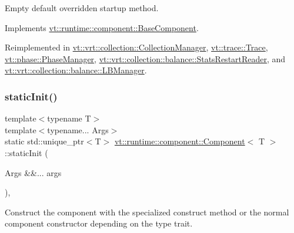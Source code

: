 Empty default overridden startup method. 



Implements \hyperlink{structvt_1_1runtime_1_1component_1_1_base_component_a8bf92f9f0a7027abf7deaefa2e7f5202}{vt\+::runtime\+::component\+::\+Base\+Component}.



Reimplemented in \hyperlink{structvt_1_1vrt_1_1collection_1_1_collection_manager_ac71095016a20dd9607f2f937bf35305e}{vt\+::vrt\+::collection\+::\+Collection\+Manager}, \hyperlink{structvt_1_1trace_1_1_trace_a5dd8767d9020ebeaba49ea3a684738a1}{vt\+::trace\+::\+Trace}, \hyperlink{structvt_1_1phase_1_1_phase_manager_a541d1f6c7a350fad979911ac60f38025}{vt\+::phase\+::\+Phase\+Manager}, \hyperlink{structvt_1_1vrt_1_1collection_1_1balance_1_1_stats_restart_reader_a0a2bd4e4f989766216237d6aedfaaa51}{vt\+::vrt\+::collection\+::balance\+::\+Stats\+Restart\+Reader}, and \hyperlink{structvt_1_1vrt_1_1collection_1_1balance_1_1_l_b_manager_add5427abf4c6e21e39f581635997ddac}{vt\+::vrt\+::collection\+::balance\+::\+L\+B\+Manager}.

\mbox{\label{structvt_1_1runtime_1_1component_1_1_component_ac969a635e579cf7be3af696f500bf260}} 
\subsubsection{\texorpdfstring{static\+Init()}{staticInit()}}
{\footnotesize\ttfamily template$<$typename T$>$ \\
template$<$typename... Args$>$ \\
static std\+::unique\+\_\+ptr$<$T$>$ \hyperlink{structvt_1_1runtime_1_1component_1_1_component}{vt\+::runtime\+::component\+::\+Component}$<$ T $>$\+::static\+Init (\begin{DoxyParamCaption}\item[{Args \&\&...}]{args }\end{DoxyParamCaption})\hspace{0.3cm}{\ttfamily [inline]}, {\ttfamily [static]}}



Construct the component with the specialized construct method or the normal component constructor depending on the type trait. 


